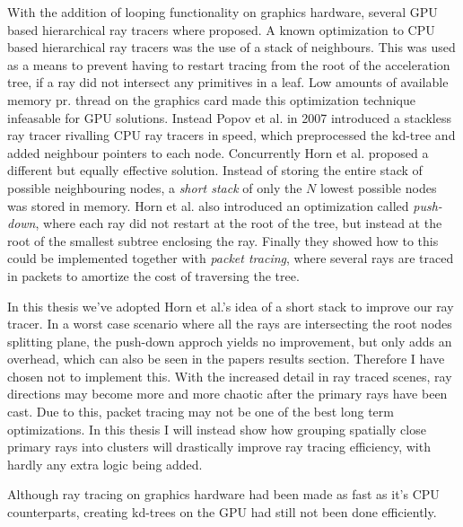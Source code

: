 With the addition of looping functionality on graphics hardware,
several GPU based hierarchical ray tracers where proposed. A known
optimization to CPU based hierarchical ray tracers was the use of a
stack of neighbours. This was used as a means to prevent having to
restart tracing from the root of the acceleration tree, if a ray did
not intersect any primitives in a leaf. Low amounts of available
memory pr. thread on the graphics card made this optimization
technique infeasable for GPU solutions. Instead Popov et
al. in 2007 introduced a stackless ray tracer
rivalling CPU ray tracers in speed, which preprocessed the kd-tree and
added neighbour pointers to each node. Concurrently Horn et
al. proposed a different but equally effective
solution. Instead of storing the entire stack of possible neighbouring
nodes, a \textit{short stack} of only the $N$ lowest possible nodes
was stored in memory. Horn et al. also introduced an optimization
called \textit{push-down}, where each ray did not restart at the root
of the tree, but instead at the root of the smallest subtree enclosing
the ray. Finally they showed how to this could be implemented together
with \textit{packet tracing}, where several rays are traced in packets
to amortize the cost of traversing the tree.

In this thesis we've adopted Horn et al.'s idea of a short stack to
improve our ray tracer. In a worst case scenario where all the rays
are intersecting the root nodes splitting plane, the push-down approch
yields no improvement, but only adds an overhead, which can also be
seen in the papers results section. Therefore I have chosen not to
implement this. With the increased detail in ray traced scenes, ray
directions may become more and more chaotic after the primary rays
have been cast. Due to this, packet tracing may not be one of the best
long term optimizations. In this thesis I will instead show how
grouping spatially close primary rays into clusters will drastically
improve ray tracing efficiency, with hardly any extra logic being
added.



Although ray tracing on graphics hardware had been made as fast as
it's CPU counterparts, creating kd-trees on the GPU had still not been
done efficiently. 


